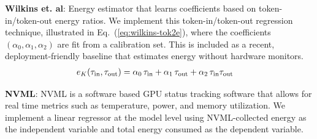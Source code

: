 \textbf{Wilkins et. al}: Energy estimator that learns coefficients based on token-in/token-out energy ratios. We implement this token-in/token-out regression technique, illustrated in  
Eq.~(\ref{eq:wilkins-tok2e}), where the coefficients $(\alpha_0,\alpha_1,\alpha_2)$ are fit from a calibration set. This is included as a recent, deployment-friendly baseline that estimates energy without hardware monitors. 
% 
\vspace{-6pt}
\setlength{\abovedisplayskip}{2pt}
\setlength{\belowdisplayskip}{2pt}
\begin{equation}
\begin{aligned}
e_K(\tau_{\mathrm{in}}, \tau_{\mathrm{out}})=\;&\alpha_0\,\tau_{\mathrm{in}}+\alpha_1\,\tau_{\mathrm{out}}
+\alpha_2\,\tau_{\mathrm{in}}\tau_{\mathrm{out}}
\end{aligned}
\label{eq:wilkins-tok2e}
\vspace{-6pt}
\end{equation}

\textbf{NVML}: NVML is a software based GPU status tracking software that allows for real time metrics such as temperature, power, and memory utilization. We implement a linear regressor at the model level using NVML-collected energy as the independent variable and total energy consumed as the dependent variable. 



